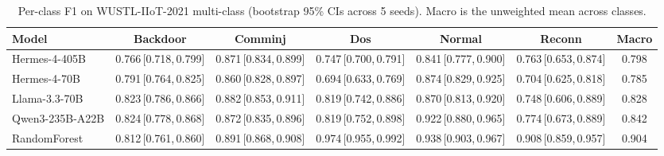 \begin{table}[t]
\centering
\caption{Per-class F1 on WUSTL-IIoT-2021 multi-class (bootstrap 95\% CIs across 5 seeds). Macro is the unweighted mean across classes.}
\label{tab:wustl-perclass}
\small
\setlength{\tabcolsep}{4pt}
\begin{tabular}{lcccccc}
\toprule
Model & Backdoor & Comminj & Dos & Normal & Reconn & Macro \\
\midrule
Hermes-4-405B & 0.766\,[0.718,\,0.799] & 0.871\,[0.834,\,0.899] & 0.747\,[0.700,\,0.791] & 0.841\,[0.777,\,0.900] & 0.763\,[0.653,\,0.874] & 0.798 \\
Hermes-4-70B & 0.791\,[0.764,\,0.825] & 0.860\,[0.828,\,0.897] & 0.694\,[0.633,\,0.769] & 0.874\,[0.829,\,0.925] & 0.704\,[0.625,\,0.818] & 0.785 \\
Llama-3.3-70B & 0.823\,[0.786,\,0.866] & 0.882\,[0.853,\,0.911] & 0.819\,[0.742,\,0.886] & 0.870\,[0.813,\,0.920] & 0.748\,[0.606,\,0.889] & 0.828 \\
Qwen3-235B-A22B & 0.824\,[0.778,\,0.868] & 0.872\,[0.835,\,0.896] & 0.819\,[0.752,\,0.898] & 0.922\,[0.880,\,0.965] & 0.774\,[0.673,\,0.889] & 0.842 \\
RandomForest & 0.812\,[0.761,\,0.860] & 0.891\,[0.868,\,0.908] & 0.974\,[0.955,\,0.992] & 0.938\,[0.903,\,0.967] & 0.908\,[0.859,\,0.957] & 0.904 \\
\bottomrule
\end{tabular}
\end{table}
